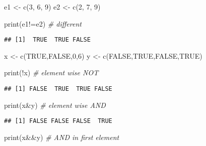 \documentclass[
]{article}
\newenvironment{Shaded}{\begin{snugshade}}{\end{snugshade}}
\newcommand{\CommentTok}[1]{\textcolor[rgb]{0.56,0.35,0.01}{\textit{#1}}}
\newcommand{\ConstantTok}[1]{\textcolor[rgb]{0.00,0.00,0.00}{#1}}
\newcommand{\DecValTok}[1]{\textcolor[rgb]{0.00,0.00,0.81}{#1}}
\newcommand{\FunctionTok}[1]{\textcolor[rgb]{0.00,0.00,0.00}{#1}}
\newcommand{\NormalTok}[1]{#1}
\newcommand{\OtherTok}[1]{\textcolor[rgb]{0.56,0.35,0.01}{#1}}
\newcommand{\SpecialCharTok}[1]{\textcolor[rgb]{0.00,0.00,0.00}{#1}}
\begin{document}
\begin{Shaded}
\begin{Highlighting}[]
\NormalTok{e1 }\OtherTok{\textless{}{-}} \FunctionTok{c}\NormalTok{(}\DecValTok{3}\NormalTok{, }\DecValTok{6}\NormalTok{, }\DecValTok{9}\NormalTok{)}
\NormalTok{e2 }\OtherTok{\textless{}{-}} \FunctionTok{c}\NormalTok{(}\DecValTok{2}\NormalTok{, }\DecValTok{7}\NormalTok{, }\DecValTok{9}\NormalTok{)}

\FunctionTok{print}\NormalTok{(e1}\SpecialCharTok{!=}\NormalTok{e2) }\CommentTok{\# different}
\end{Highlighting}
\end{Shaded}

\begin{verbatim}
## [1]  TRUE  TRUE FALSE
\end{verbatim}

\begin{Shaded}
\begin{Highlighting}[]
\NormalTok{x }\OtherTok{\textless{}{-}} \FunctionTok{c}\NormalTok{(}\ConstantTok{TRUE}\NormalTok{,}\ConstantTok{FALSE}\NormalTok{,}\DecValTok{0}\NormalTok{,}\DecValTok{6}\NormalTok{)}
\NormalTok{y }\OtherTok{\textless{}{-}} \FunctionTok{c}\NormalTok{(}\ConstantTok{FALSE}\NormalTok{,}\ConstantTok{TRUE}\NormalTok{,}\ConstantTok{FALSE}\NormalTok{,}\ConstantTok{TRUE}\NormalTok{)}

\FunctionTok{print}\NormalTok{(}\SpecialCharTok{!}\NormalTok{x) }\CommentTok{\# element wise NOT}
\end{Highlighting}
\end{Shaded}

\begin{verbatim}
## [1] FALSE  TRUE  TRUE FALSE
\end{verbatim}

\begin{Shaded}
\begin{Highlighting}[]
\FunctionTok{print}\NormalTok{(x}\SpecialCharTok{\&}\NormalTok{y) }\CommentTok{\# element wise AND }
\end{Highlighting}
\end{Shaded}

\begin{verbatim}
## [1] FALSE FALSE FALSE  TRUE
\end{verbatim}

\begin{Shaded}
\begin{Highlighting}[]
\FunctionTok{print}\NormalTok{(x}\SpecialCharTok{\&\&}\NormalTok{y) }\CommentTok{\# AND in first element}
\end{Highlighting}
\end{Shaded}
\end{document}
